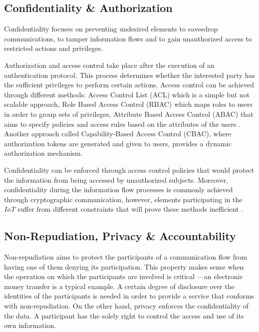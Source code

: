 \documentclass[journal]{IEEEtran}
\begin{document}
  \subsection{Confidentiality \& Authorization}
  Confidentiality focuses on preventing undesired elements to eavesdrop communications, to tamper information flows and to gain unauthorized access to restricted actions and privileges.

  Authorization and access control take place after the execution of an authentication protocol. This process determines whether the interested party has the sufficient privileges to perform certain actions. Access control can be achieved through different methods: Access Control List (ACL) which is a simple but not scalable approach, Role Based Access Control (RBAC) which maps roles to users in order to group sets of privileges, Attribute Based Access Control (ABAC) that aims to specify policies and access rules based on the attributes of the users  \cite{Anggorojati2014}. Another approach called Capability-Based Access Control (CBAC), where authorization tokens are generated and given to users, provides a dynamic authorization mechanism.

  Confidentiality can be enforced through access control policies that would protect the information from being accessed by unauthorized subjects. Moreover, confidentiality during the information flow processes is commonly achieved through cryptographic communication, however, elements participating in the \emph{IoT} suffer from different constraints that will prove these methods inefficient \cite{Baldini2012}.    

  \subsection{Non-Repudiation, Privacy \& Accountability}
  Non-repudiation aims to protect the participants of a communication flow from having one of them denying its participation. This property makes sense when the operation on which the participants are involved is critical ---an electronic money transfer is a typical example. A certain degree of disclosure over the identities of the participants is needed in order to provide a service that conforms with non-repudiation. On the other hand, privacy enforces the confidentiality of the data. A participant has the solely right to control the access and use of its own information.
\end{document}
